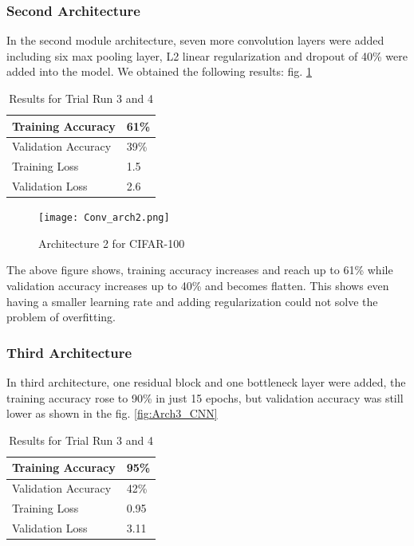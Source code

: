 \documentclass{article}
\begin{document}
\subsubsection{Second Architecture}
In the second module architecture, seven more convolution layers were added including six max pooling layer, L2 linear regularization and dropout of 40\% were added into the model. We obtained the following results: fig. \ref{fig:Arch2_CNN}

\begin{table}[h]
\centering
\caption{Results for Trial Run 3 and 4}
\begin{tabular}{|l|l|}
\hline
Training Accuracy   & 61\% \\ \hline
Validation Accuracy & 39\% \\ \hline
Training Loss        & 1.5    \\ \hline
Validation Loss     & 2.6    \\ \hline
\end{tabular}
\end{table}

\begin{figure}[H]
    \centering
    \texttt{[image: Conv\_arch2.png]}
    \caption{Architecture 2 for CIFAR-100}
    \label{fig:Arch2_CNN}
\end{figure}

The above figure shows, training accuracy increases and reach up to 61\% while validation accuracy increases up to 40\% and becomes flatten. This shows even having a smaller learning rate and adding regularization could not solve the problem of overfitting. 


\subsubsection{Third Architecture}
In third architecture, one residual block and one bottleneck layer were added, the training accuracy rose to 90\% in just 15 epochs, but validation accuracy was still lower as shown in the fig. \ref{fig:Arch3_CNN}

\begin{table}[h]
\centering
\caption{Results for Trial Run 3 and 4}
\begin{tabular}{|l|l|}
\hline
Training Accuracy   & 95\% \\ \hline
Validation Accuracy & 42\% \\ \hline
Training Loss        & 0.95 \\ \hline
Validation Loss     & 3.11  \\ \hline
\end{tabular}
\end{table}
\end{document}
